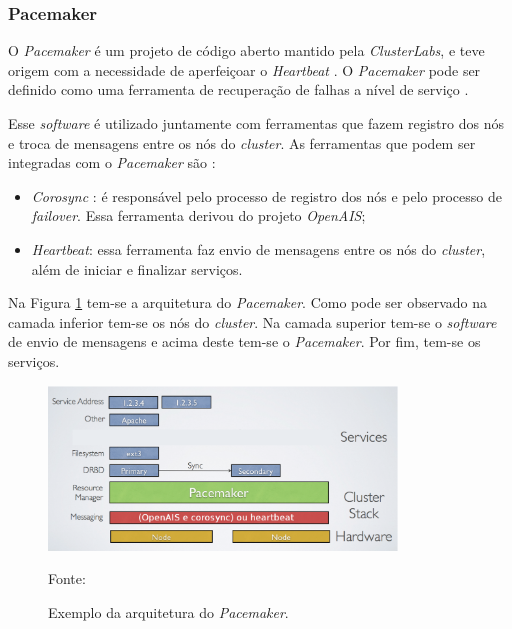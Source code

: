 \subsubsection{Pacemaker}
\label{section:pacemaker}
O \textit{Pacemaker} \cite{pacemaker} é um projeto de código aberto mantido pela \textit{ClusterLabs}, e teve origem com a necessidade de 
aperfeiçoar o \textit{Heartbeat} \cite{heartbeat}. 
O \textit{Pacemaker} pode ser definido como uma ferramenta de recuperação de falhas a nível de serviço \cite{perkov2011}. 

Esse \textit{software} é utilizado juntamente com ferramentas que fazem registro dos nós e troca de mensagens entre os nós do \textit{cluster}.
As ferramentas que podem ser integradas com o \textit{Pacemaker} são \cite{pacemaker}:
\begin{itemize}
 \item \textit{Corosync} \cite{corosync}: é responsável pelo processo de registro dos nós e pelo processo de \textit{failover}.
 Essa ferramenta derivou do projeto \textit{OpenAIS};
 \item \textit{Heartbeat}: essa ferramenta faz envio de mensagens entre os nós do \textit{cluster}, além de iniciar e finalizar serviços.
\end{itemize}


Na Figura \ref{fig:pacemaker_tools} tem-se a arquitetura do \textit{Pacemaker}. Como pode ser observado na camada inferior tem-se os nós do 
\textit{cluster}. Na camada superior tem-se o \textit{software} de envio de mensagens e acima deste tem-se o \textit{Pacemaker}. 
Por fim, tem-se os serviços.

\begin{figure}[h!]
 \centering
 \includegraphics[width=350px]{img/pacemaker_tools.eps}
 \caption{Exemplo da arquitetura do \textit{Pacemaker}.}
 Fonte: \citet{pacemaker}
 \label{fig:pacemaker_tools}
\end{figure}


